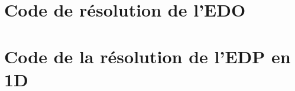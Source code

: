 \begin{appendices}
\chapter{Code de résolution de l'EDO}

\chapter{Code de la résolution de l'EDP en 1D}

\end{appendices} 